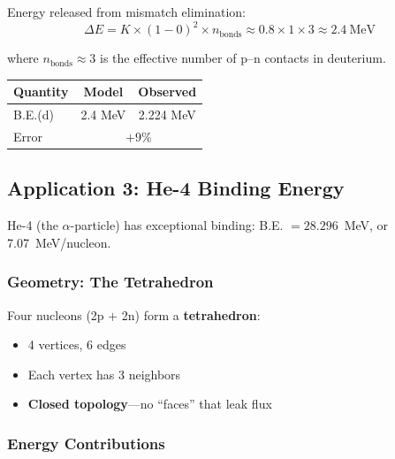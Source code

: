 Energy released from mismatch elimination:
\begin{equation}
    \Delta E = K \times (1 - 0)^2 \times n_{\text{bonds}} \approx 0.8 \times 1 \times 3 \approx 2.4~\text{MeV}
\end{equation}

where $n_{\text{bonds}} \approx 3$ is the effective number of p--n contacts in deuterium.

\begin{tcolorbox}[colback=green!5!white, colframe=green!75!black, title=Result: Deuterium Binding]
\begin{center}
\begin{tabular}{lcc}
\hline
Quantity & Model & Observed \\
\hline
B.E.(d) & 2.4 MeV & 2.224 MeV \\
Error & \multicolumn{2}{c}{$+9\%$} \\
\hline
\end{tabular}
\end{center}
\end{tcolorbox}

\subsection{Application 3: He-4 Binding Energy}
\label{subsec:m6-he4}

He-4 (the $\alpha$-particle) has exceptional binding: B.E. $= 28.296$~MeV, or 7.07~MeV/nucleon.

\subsubsection{Geometry: The Tetrahedron}

Four nucleons (2p + 2n) form a \textbf{tetrahedron}:
\begin{itemize}
    \item 4 vertices, 6 edges
    \item Each vertex has 3 neighbors
    \item \textbf{Closed topology}—no ``faces'' that leak flux
\end{itemize}

\subsubsection{Energy Contributions}

